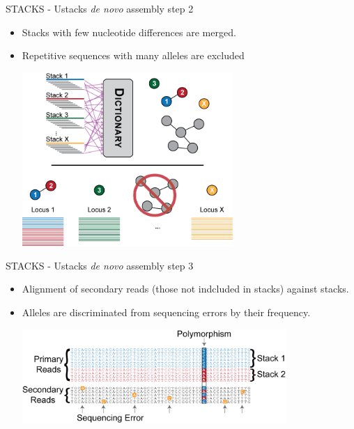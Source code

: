 \documentclass[presentation]{beamer}
\begin{document}
\begin{frame}[label=sec-4-1-4]{STACKS - Ustacks \emph{de novo} assembly step 2}
\begin{itemize}
\item Stacks with few nucleotide differences are merged.
\item Repetitive sequences with many alleles are excluded
\begin{center}
\includegraphics[width=8cm]{Catchen2013DeNovoStep2.png}

\tiny{\citep{Catchen2013a}}
\end{center}
\end{itemize}
\end{frame}


\begin{frame}[label=sec-4-1-5]{STACKS - Ustacks \emph{de novo} assembly step 3}
\begin{itemize}
\item Alignment of secondary reads (those not indcluded in stacks) against
stacks.
\item Alleles are discriminated from sequencing errors by their frequency.
\begin{center}
\includegraphics[width=10cm]{Catchen2013DeNovoStep3.png}

\tiny{\citep{Catchen2013a}}
\end{center}
\end{itemize}
\end{frame}
\end{document}
